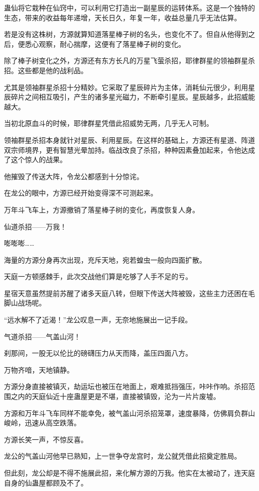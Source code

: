 \begin{this_body}
蛊仙将它栽种在仙窍中，可以利用它打造出一副星辰的运转体系。这是一个独特的生态，带来的收益每年递增，天长日久，年复一年，收益总量几乎无法估算。

若是没有这株树，方源就算知道落星棒子树的名头，也变化不了。但自从他得到之后，便悉心观察，耐心揣摩，这便有了落星棒子树的变化。

除了棒子树变化之外，方源还有东方长凡的万星飞萤杀招，耶律群星的领袖群星杀招。这些都是他的战利品。

尤其是领袖群星杀招十分精妙。它采取了星辰碎片为主体，消耗仙元很少，利用星辰碎片之间相互吸引，产生的诸多星光磁力，不断牵引星辰。星辰越多，此招威能越大。

当初北原血斗的时候，耶律群星凭借此招威势无两，几乎无人可制。

领袖群星杀招本身就针对星辰、利用星辰。在这样的基础上，方源还有星道、阵道双宗师境界，更有智慧光晕加持。临战改良了杀招，种种因素叠加起来，令他达成了这个惊人的战果。

他摧毁了传送大阵，令龙公都感到十分惊诧。

在龙公的眼中，方源已经开始变得深不可测起来。

万年斗飞车上，方源撤销了落星棒子树的变化，再度恢复人身。

仙道杀招——万我！

嘭嘭嘭……

海量的方源分身再次出现，充斥天地，宛若蝗虫一般向四面扩散。

天庭一方顿感棘手，此次交战他们算是吃够了人手不足的亏。

星宿天意虽然提前苏醒了诸多天庭八转，但眼下传送大阵被毁，这些主力还困在毛脚山战场呢。

“远水解不了近渴！”龙公叹息一声，无奈地施展出一记手段。

气道杀招——气盖山河！

刹那间，一股无以伦比的磅礴压力从天而降，盖压四面八方。

万物齐喑，天地镇静。

方源分身直接被镇灭，劫运坛也被压在地面上，艰难抵挡强压，咔咔作响。杀招范围之内的天庭仙近十座蛊屋更是不堪，直接被镇毁，沦为一片片废墟。

方源和万年斗飞车同样不能幸免，被气盖山河杀招笼罩，速度暴降，仿佛肩负群山峻岭，迅速从高空跌落。

方源长笑一声，不惊反喜。

龙公的气盖山河他早已熟知，上一世争夺龙宫时，龙公就凭借此招奠定胜局。

但此刻，龙公却是不得不施展此招，来化解方源的万我。他实在太被动了，连天庭自身的仙蛊屋都顾及不了。


\end{this_body}
